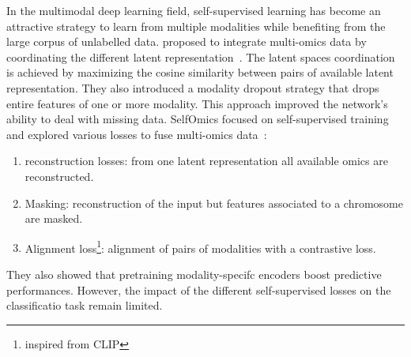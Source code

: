 \documentclass[../main.tex]{subfiles}
\begin{document}
	    In the multimodal deep learning field, self-supervised learning has become an attractive strategy to learn from multiple modalities while benefiting from the large corpus of unlabelled data.
	    \citeauthor{Cheerla2019} proposed to integrate multi-omics data by coordinating the different latent representation~\cite{Cheerla2019}.
	    The latent spaces coordination is achieved by maximizing the cosine similarity between pairs of available latent representation.
	    They also introduced a modality dropout strategy that drops entire features of one or more modality.
	    This approach improved the network’s ability to deal with missing data.
	    SelfOmics focused on self-supervised training and explored various losses to fuse multi-omics data~\cite{selfOmics}:
	    \begin{enumerate}[nosep]
	      \item reconstruction losses: from one latent representation all available omics are reconstructed.
	      \item Masking: reconstruction of the input but features associated to a chromosome are masked.
	      \item Alignment loss\footnote{inspired from CLIP}: alignment of pairs of modalities with a contrastive loss.
	    \end{enumerate}
	    They also showed that pretraining modality-specifc encoders boost predictive performances.
	    However, the impact of the different self-supervised losses on the classificatio task remain limited.
\end{document}
